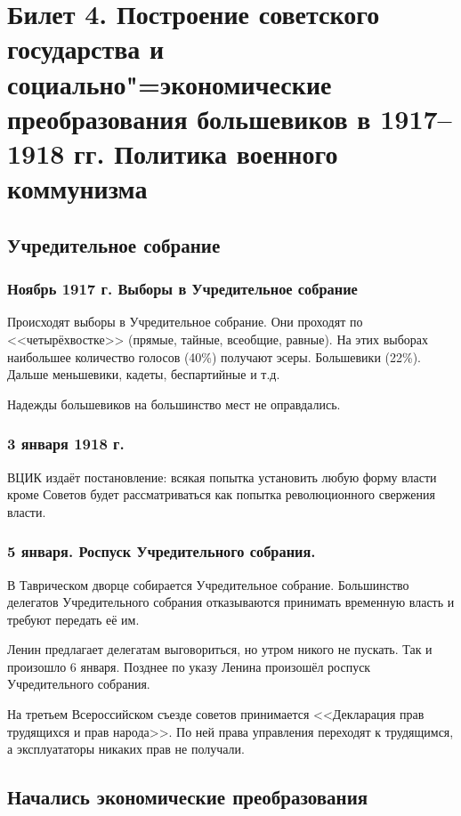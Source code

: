 \section{Билет 4. Построение советского государства и социально"=экономические преобразования большевиков в 1917--1918 гг. Политика военного коммунизма}

\subsection{Учредительное собрание}

\subsubsection{\textbf{Ноябрь 1917 г. Выборы в Учредительное собрание}}

 Происходят выборы в Учредительное собрание. Они проходят по <<четырёхвостке>> (прямые, тайные, всеобщие, равные). На этих выборах наибольшее количество голосов (40\%) получают эсеры. Большевики (22\%). Дальше меньшевики, кадеты, беспартийные и т.д.

Надежды большевиков на большинство мест не оправдались.

\subsubsection{\textbf{3 января 1918 г.}}

ВЦИК издаёт постановление: всякая попытка установить любую форму власти кроме Советов будет рассматриваться как попытка революционного свержения власти.

\subsubsection{\textbf{5 января. Роспуск Учредительного собрания.}}

В Таврическом дворце собирается Учредительное собрание. Большинство делегатов Учредительного собрания отказываются принимать временную власть и требуют передать её им.

Ленин предлагает делегатам выговориться, но утром никого не пускать. Так и произошло 6 января. Позднее по указу Ленина произошёл роспуск Учредительного собрания.

На третьем Всероссийском съезде советов принимается <<Декларация прав трудящихся и прав народа>>. По ней права управления переходят к трудящимся, а эксплуататоры никаких прав не получали.

\subsection{Начались экономические преобразования}

